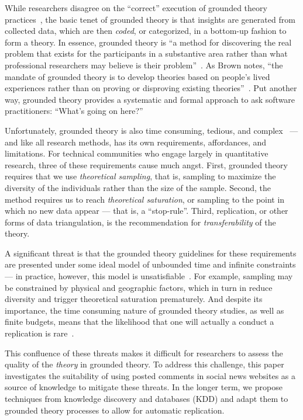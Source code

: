 \documentclass{sig-alternate}
\begin{document}
While researchers disagree on the ``correct'' execution of grounded theory practices~\cite{Suddaby2006}, the basic tenet of grounded theory is that insights are generated from collected data, which are then \textit{coded}, or categorized, in a bottom-up fashion to form a theory. In essence, grounded theory is ``a method for discovering the real problem that exists for the participants in a substantive area rather than what professional researchers may believe is their problem''~\cite{Adolph2008}. As Brown notes, ``the mandate of grounded theory is to develop theories based on people's lived experiences rather than on proving or disproving existing theories''~\cite{brown2012daring}. Put another way, grounded theory provides a systematic and formal approach to ask software practitioners: ``What's going on here?''

Unfortunately, grounded theory is also time consuming, tedious, and complex~\cite{Olson2014} --- and like all research methods, has its own requirements, affordances, and limitations. For technical communities who engage largely in quantitative research, three of these requirements cause much angst. First, grounded theory requires that we use \textit{theoretical sampling}, that is, sampling to maximize the diversity of the individuals rather than the size of the sample. Second, the method requires us to reach \textit{theoretical saturation}, or sampling to the point in which no new data appear --- that is, a ``stop-rule''. Third, replication, or other forms of data triangulation, is the recommendation for \textit{transferability} of the theory.

A significant threat is that the grounded theory guidelines for these requirements are presented under some ideal model of unbounded time and infinite constraints --- in practice, however, this model is unsatisfiable~\cite{Mason2010}. For example, sampling may be constrained by physical and geographic factors, which in turn in reduce diversity and trigger theoretical saturation prematurely. And despite its importance, the time consuming nature of grounded theory studies, as well as finite budgets, means that the likelihood that one will actually a conduct a replication is rare~\cite{Shull2008b}.

This confluence of these threats makes it difficult for researchers to assess the quality of the \textit{theory} in grounded theory. To address this challenge, this paper investigates the suitability of using posted comments in social news websites as a source of knowledge to mitigate these threats. In the longer term, we propose techniques from knowledge discovery and databases (KDD) and adapt them to grounded theory processes to allow for automatic replication.
\end{document}
